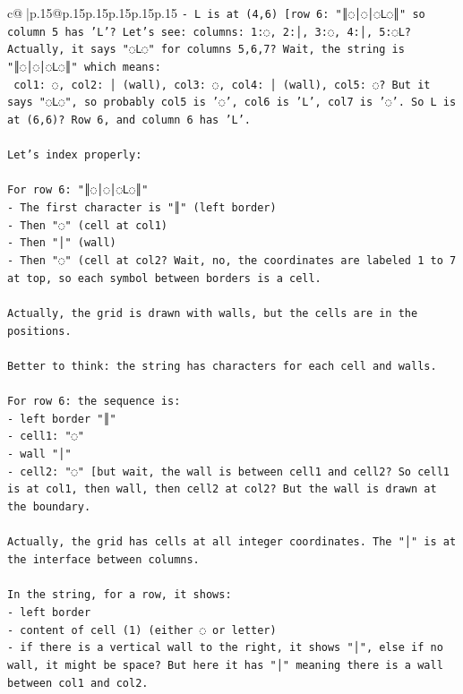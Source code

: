 \documentclass{article}
\begin{document}
{\begin{supertabular}{c@{$\;$}|p{.15\linewidth}@{}p{.15\linewidth}p{.15\linewidth}p{.15\linewidth}p{.15\linewidth}p{.15\linewidth}}
{{{\texttt{{-} L is at (4,6) {[}row 6: "║◌│◌│◌L◌║" so column 5 has 'L'? Let's see: columns: 1:◌, 2:│, 3:◌, 4:│, 5:◌L? Actually, it says "◌L◌" for columns 5,6,7? Wait, the string is "║◌│◌│◌L◌║" which means:} \\
\texttt{   col1: ◌, col2: │ (wall), col3: ◌, col4: │ (wall), col5: ◌? But it says "◌L◌", so probably col5 is '◌', col6 is 'L', col7 is '◌'. So L is at (6,6)? Row 6, and column 6 has 'L'.} \\
\\ 
\texttt{Let's index properly:} \\
\\ 
\texttt{For row 6: "║◌│◌│◌L◌║"} \\
\texttt{{-} The first character is "║" (left border)} \\
\texttt{{-} Then "◌" (cell at col1)} \\
\texttt{{-} Then "│" (wall)} \\
\texttt{{-} Then "◌" (cell at col2? Wait, no, the coordinates are labeled 1 to 7 at top, so each symbol between borders is a cell.} \\
\\ 
\texttt{Actually, the grid is drawn with walls, but the cells are in the positions.} \\
\\ 
\texttt{Better to think: the string has characters for each cell and walls.} \\
\\ 
\texttt{For row 6: the sequence is:} \\
\texttt{{-} left border "║"} \\
\texttt{{-} cell1: "◌"} \\
\texttt{{-} wall "│"} \\
\texttt{{-} cell2: "◌"   {[}but wait, the wall is between cell1 and cell2? So cell1 is at col1, then wall, then cell2 at col2? But the wall is drawn at the boundary.} \\
\\ 
\texttt{Actually, the grid has cells at all integer coordinates. The "│" is at the interface between columns.} \\
\\ 
\texttt{In the string, for a row, it shows:} \\
\texttt{{-} left border} \\
\texttt{{-} content of cell (1) (either ◌ or letter)} \\
\texttt{{-} if there is a vertical wall to the right, it shows "│", else if no wall, it might be space? But here it has "│" meaning there is a wall between col1 and col2.} \\
}}}
\end{supertabular}}
\end{document}
